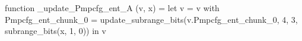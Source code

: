 function _update_Pmpcfg_ent_A (v, x) = let v = { v with Pmpcfg_ent_chunk_0 = update_subrange_bits(v.Pmpcfg_ent_chunk_0, 4, 3, subrange_bits(x, 1, 0)) } in
  v
